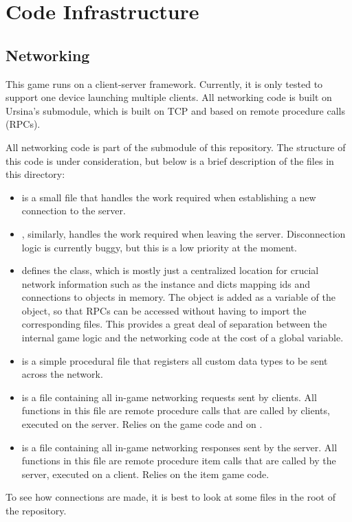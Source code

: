 \documentclass{article}
\begin{document}
\section{Code Infrastructure}
\subsection{Networking}
This game runs on a client-server framework. Currently, it is only tested to
support one device launching multiple clients.
All networking code is built on Ursina's
 submodule, which is built on TCP and based on remote
procedure calls (RPCs).

All networking code is part of the  submodule of this
repository. The structure of this code is under consideration, but below is a
brief description of the files in this directory:
\begin{itemize}
    \item {} is a small file that handles the work required
        when establishing a new connection to the server.
    \item {}, similarly, handles the work required when
        leaving the server. Disconnection logic is currently buggy, but this
        is a low priority at the moment.
    \item {} defines the  class, which is
        mostly just a centralized location for crucial network information
        such as the  instance and dicts mapping ids and connections
        to objects in memory. The  object is added as a
        variable of the  object, so that RPCs can be accessed
        without having to import the corresponding files. This provides a great
        deal of separation between the internal game logic and the networking
        code at the cost of a global variable.
    \item {} is a simple procedural file that registers all
        custom data types to be sent across the network.
    \item {} is a file containing all in-game networking
        requests sent by clients. All functions in this file are remote procedure
        calls that are called by clients, executed on the server. Relies on the
        game code and on .
    \item {} is a file containing all in-game networking
        responses sent by the server. All functions in this file are remote procedure
        item calls that are called by the server, executed on a client. Relies on the
        item game code.
\end{itemize}
To see how connections are made, it is best to look at some files in the root of the
repository.
\end{document}
